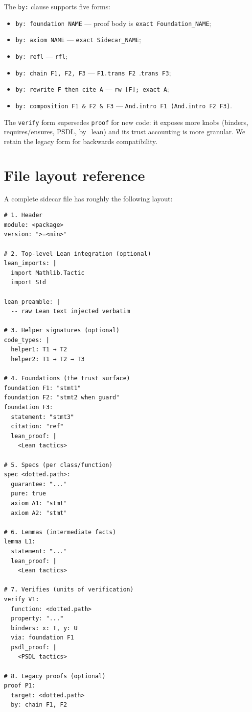 The \texttt{by:} clause supports five forms:
\begin{itemize}[leftmargin=1.7em]
  \item \texttt{by: foundation NAME} --- proof body is
    \verb|exact Foundation_NAME|;
  \item \texttt{by: axiom NAME} --- \verb|exact Sidecar_NAME|;
  \item \texttt{by: refl} --- \verb|rfl|;
  \item \texttt{by: chain F1, F2, F3} --- \verb|F1.trans F2 |.\verb|trans F3|;
  \item \texttt{by: rewrite F then cite A} --- \verb|rw [F]; exact A|;
  \item \texttt{by: composition F1 \& F2 \& F3} --- \verb|And.intro F1 (And.intro F2 F3)|.
\end{itemize}

The \texttt{verify} form supersedes \texttt{proof} for new code: it
exposes more knobs (binders, requires/ensures, PSDL, by\_lean) and
its trust accounting is more granular.  We retain the legacy form
for backwards compatibility.

\section{File layout reference}
\label{sec:layout-ref}

A complete sidecar file has roughly the following layout:

\begin{lstlisting}[language=deppyfile,caption={Canonical layout of a sidecar file.}]
# 1. Header
module: <package>
version: ">=<min>"

# 2. Top-level Lean integration (optional)
lean_imports: |
  import Mathlib.Tactic
  import Std

lean_preamble: |
  -- raw Lean text injected verbatim

# 3. Helper signatures (optional)
code_types: |
  helper1: T1 → T2
  helper2: T1 → T2 → T3

# 4. Foundations (the trust surface)
foundation F1: "stmt1"
foundation F2: "stmt2 when guard"
foundation F3:
  statement: "stmt3"
  citation: "ref"
  lean_proof: |
    <Lean tactics>

# 5. Specs (per class/function)
spec <dotted.path>:
  guarantee: "..."
  pure: true
  axiom A1: "stmt"
  axiom A2: "stmt"

# 6. Lemmas (intermediate facts)
lemma L1:
  statement: "..."
  lean_proof: |
    <Lean tactics>

# 7. Verifies (units of verification)
verify V1:
  function: <dotted.path>
  property: "..."
  binders: x: T, y: U
  via: foundation F1
  psdl_proof: |
    <PSDL tactics>

# 8. Legacy proofs (optional)
proof P1:
  target: <dotted.path>
  by: chain F1, F2
\end{lstlisting}

